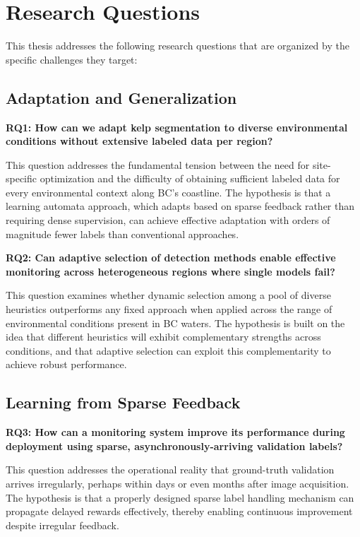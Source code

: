 \documentclass[12pt,oneside]{book}
\begin{document}
\section{Research Questions}
\label{sec:research-questions}

This thesis addresses the following research questions that are organized by the specific challenges they target:

\subsection{Adaptation and Generalization}

\textbf{RQ1: How can we adapt kelp segmentation to diverse environmental conditions without extensive labeled data per region?}

This question addresses the fundamental tension between the need for site-specific optimization and the difficulty of obtaining sufficient labeled data for every environmental context along BC's coastline. The hypothesis is that a learning automata approach, which adapts based on sparse feedback rather than requiring dense supervision, can achieve effective adaptation with orders of magnitude fewer labels than conventional approaches.

\textbf{RQ2: Can adaptive selection of detection methods enable effective monitoring across heterogeneous regions where single models fail?}

This question examines whether dynamic selection among a pool of diverse heuristics outperforms any fixed approach when applied across the range of environmental conditions present in BC waters. The hypothesis is built on the idea that different heuristics will exhibit complementary strengths across conditions, and that adaptive selection can exploit this complementarity to achieve robust performance.

\subsection{Learning from Sparse Feedback}

\textbf{RQ3: How can a monitoring system improve its performance during deployment using sparse, asynchronously-arriving validation labels?}

This question addresses the operational reality that ground-truth validation arrives irregularly, perhaps within days or even months after image acquisition. The hypothesis is that a properly designed sparse label handling mechanism can propagate delayed rewards effectively, thereby enabling continuous improvement despite irregular feedback.
\end{document}
